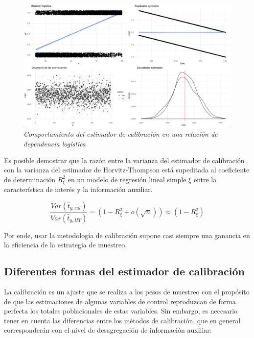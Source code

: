 \documentclass[
  12pt,
]{book}
\begin{document}
\begin{figure}
\centering
\includegraphics{Pics/c8.png}
\caption{\emph{Comportamiento del estimador de calibración en una relación de dependencia logística}}
\end{figure}

Es posible demostrar que la razón entre la varianza del estimador de calibración con la varianza del estimador de Horvitz-Thompson está supeditada al coeficiente de determinación \(R^2_{\xi}\) en un modelo de regresión lineal simple \(\xi\) entre la característica de interés y la información auxiliar.

\[
\frac{Var(\hat t_{y, cal})}{Var(\hat t_{y, HT})} = (1-R^2_{\xi} + o(\sqrt{n})) \approx (1-R^2_{\xi})
\]

Por ende, usar la metodología de calibración supone casi siempre una ganancia en la eficiencia de la estrategia de muestreo.

\hypertarget{diferentes-formas-del-estimador-de-calibraciuxf3n}{%
\subsection{Diferentes formas del estimador de calibración}\label{diferentes-formas-del-estimador-de-calibraciuxf3n}}

La calibración es un ajuste que se realiza a los pesos de muestreo con el propósito de que las estimaciones de algunas variables de control reproduzcan de forma perfecta los totales poblacionales de estas variables. Sin embargo, es necesario tener en cuenta las diferencias entre los métodos de calibración, que en general corresponderán con el nivel de desagregación de información auxiliar:
\end{document}
